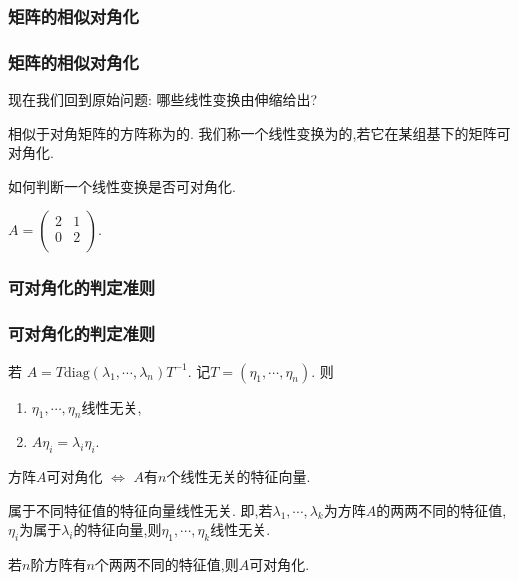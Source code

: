 \subsubsection{矩阵的相似对角化}
\begin{frame}\frametitle{矩阵的相似对角化}

现在我们回到原始问题: 哪些线性变换由伸缩给出?
\pp
\begin{definition}[可对角化]
相似于对角矩阵的方阵称为的.
\pp
我们称一个线性变换为的,若它在某组基下的矩阵可对角化.
\end{definition}
\pp
{} 如何判断一个线性变换是否可对角化.
\pp
\begin{example}[不是所有的线性变换和矩阵都可对角化]
$A=\begin{pmatrix}
2&1\\0&2\\\end{pmatrix}$.
\end{example}
\end{frame}






\renewcommand{\mydate}{2025年05月20号\ 第二十二次课}



\subsubsection{可对角化的判定准则}
\begin{frame}\frametitle{可对角化的判定准则}
若 $ A=T\mathrm{diag}(\lambda_1,\cdots,\lambda_n)T^{-1}$. 记$T=(\eta_1,\cdots,\eta_n)$.
\pp
则
\begin{enumerate}
\item $\eta_1,\cdots,\eta_n$线性无关,
\pp
\item $A\eta_i=\lambda_i\eta_i$.
\end{enumerate}
\pp
\begin{theorem}[利用特征向量来判定]
方阵$A$可对角化 $\Leftrightarrow$ $A$有$n$个线性无关的特征向量.
\end{theorem}
\pp
{}
\pp
\begin{lemma}
属于不同特征值的特征向量线性无关.
\pp 即,若$\lambda_1,\cdots,\lambda_k$为方阵$A$的两两不同的特征值,$\eta_i$为属于$\lambda_i$的特征向量,则$\eta_1,\cdots,\eta_k$线性无关.
\end{lemma}
\pp
{}
\pp
\begin{corollary}[利用特征值来判定]
若$n$阶方阵有$n$个两两不同的特征值,则$A$可对角化.
\end{corollary}
\pp
{}
\end{frame}





